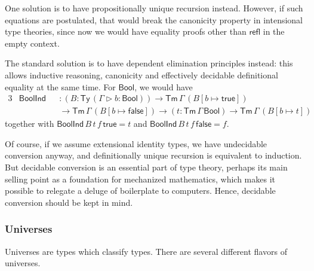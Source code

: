 \documentclass[12pt,a4paper,twoside,openany]{book}
\theoremstyle{remark}
\theoremstyle{definition}
\newcommand{\ms}[1]{\mathsf{#1}}
\newcommand{\refl}{\mathsf{refl}}
\newcommand{\Tm}{\mathsf{Tm}}
\newcommand{\Ty}{\mathsf{Ty}}
\newcommand{\ext}{\triangleright}
\newcommand{\Bool}{\ms{Bool}}
\newcommand{\true}{\ms{true}}
\newcommand{\false}{\ms{false}}
\begin{document}
One solution is to have propositionally unique recursion instead. However, if
such equations are postulated, that would break the canonicity property in
intensional type theories, since now we would have equality proofs other than
$\refl$ in the empty context.

The standard solution is to have dependent elimination principles instead: this
allows inductive reasoning, canonicity and effectively decidable definitional
equality at the same time. For $\Bool$, we would have
\begin{alignat*}{3}
  & \ms{BoolInd} &&: (B : \Ty\,(\Gamma\ext b : \Bool)) \to \Tm\,\Gamma\,(B[b \mapsto \true])\\
  & &&\to \Tm\,\Gamma\,(B[b \mapsto \false]) \to (t : \Tm\,\Gamma\,\Bool) \to \Tm\,\Gamma\,(B[b \mapsto t])
\end{alignat*}
together with $\ms{BoolInd}\,B\,t\,f\,\true = t$ and $\ms{BoolInd}\,B\,t\,f\,\false = f$.

Of course, if we assume extensional identity types, we have undecidable
conversion anyway, and definitionally unique recursion is equivalent to
induction. But decidable conversion is an essential part of type theory, perhaps
its main selling point as a foundation for mechanized mathematics, which makes
it possible to relegate a deluge of boilerplate to computers. Hence, decidable
conversion should be kept in mind.

\subsubsection{Universes}

Universes are types which classify types. There are several different flavors of
universes.
\end{document}
